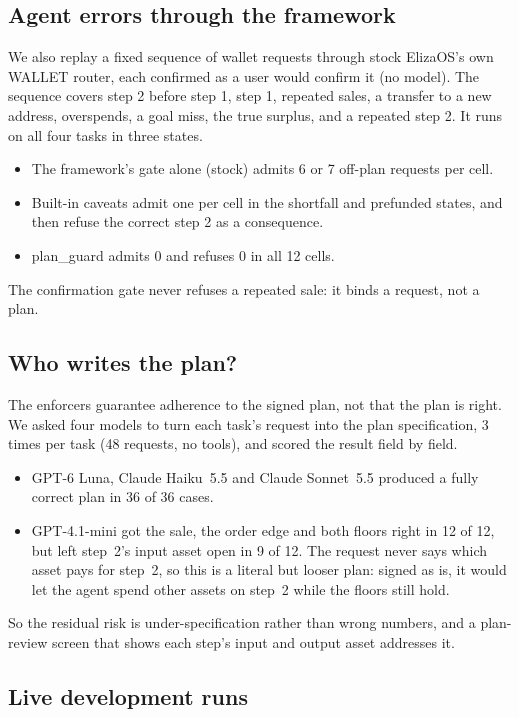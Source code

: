 \documentclass[conference]{IEEEtran}
\begin{document}
\subsection{Agent errors through the framework}

We also replay a fixed sequence of wallet requests through stock ElizaOS's own WALLET router, each confirmed as a user
would confirm it (no model). The sequence covers step 2 before step 1, step 1, repeated sales, a transfer to a new
address, overspends, a goal miss, the true surplus, and a repeated step 2. It runs on all four tasks in three states.
\begin{itemize}
\item The framework's gate alone (stock) admits 6 or 7 off-plan requests per cell.
\item Built-in caveats admit one per cell in the shortfall and prefunded states, and then refuse the correct step 2 as a
consequence.
\item plan\_guard admits 0 and refuses 0 in all 12 cells.
\end{itemize}
The confirmation gate never refuses a repeated sale: it binds a request, not a plan.

\subsection{Who writes the plan?}

The enforcers guarantee adherence to the signed plan, not that the plan is right. We asked four models to turn each
task's request into the plan specification, 3 times per task (48 requests, no tools), and scored the result field by
field.
\begin{itemize}
\item GPT-6 Luna, Claude Haiku~5.5 and Claude Sonnet~5.5 produced a fully correct plan in 36 of 36 cases.
\item GPT-4.1-mini got the sale, the order edge and both floors right in 12 of 12, but left step~2's input asset
open in 9 of 12. The request never says which asset pays for step~2, so this is a literal but looser plan: signed as
is, it would let the agent spend other assets on step~2 while the floors still hold.
\end{itemize}
So the residual risk is under-specification rather than wrong numbers, and a plan-review screen that shows each step's
input and output asset addresses it.

\subsection{Live development runs}
\end{document}
